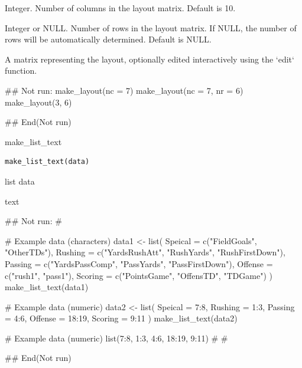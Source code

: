 \documentclass[a4paper]{book}
\begin{document}
%
\begin{Arguments}
\begin{ldescription}
\item[\code{nc}] Integer. Number of columns in the layout matrix. Default is 10.

\item[\code{nr}] Integer or NULL. Number of rows in the layout matrix. If NULL, the number of rows will be automatically determined. Default is NULL.
\end{ldescription}
\end{Arguments}
%
\begin{Value}
A matrix representing the layout, optionally edited interactively using the `edit` function.
\end{Value}
%
\begin{Examples}
\begin{ExampleCode}
\#\# Not run: 
make_layout(nc = 7)
make_layout(nc = 7, nr = 6)
make_layout(3, 6)

## End(Not run)
\end{ExampleCode}
\end{Examples}
%
\begin{Description}
make\_list\_text
\end{Description}
%
\begin{Usage}
\begin{verbatim}
make_list_text(data)
\end{verbatim}
\end{Usage}
%
\begin{Arguments}
\begin{ldescription}
\item[\code{data}] list data
\end{ldescription}
\end{Arguments}
%
\begin{Value}
text
\end{Value}
%
\begin{Examples}
\begin{ExampleCode}

\#\# Not run: 
\#

# Example data (characters)
data1 <- list(
  Speical = c("FieldGoals", "OtherTDs"),
  Rushing = c("YardsRushAtt", "RushYards", "RushFirstDown"),
  Passing = c("YardsPassComp", "PassYards", "PassFirstDown"),
  Offense = c("rush1", "pass1"),
  Scoring = c("PointsGame", "OffensTD", "TDGame")
)
make_list_text(data1)

# Example data (numeric)
data2 <- list(
  Speical = 7:8,
  Rushing = 1:3,
  Passing = 4:6,
  Offense = 18:19,
  Scoring = 9:11
)
make_list_text(data2)



# Example data (numeric)
list(7:8, 1:3, 4:6, 18:19, 9:11)%
\#
\#

## End(Not run)


\end{ExampleCode}
\end{Examples}
\end{document}
